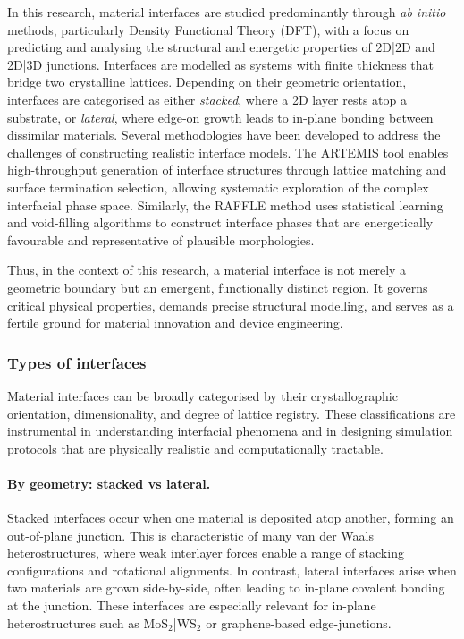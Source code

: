 In this research, material interfaces are studied predominantly through \textit{ab initio} methods, particularly Density Functional Theory (DFT), with a focus on predicting and analysing the structural and energetic properties of 2D|2D and 2D|3D junctions. Interfaces are modelled as systems with finite thickness that bridge two crystalline lattices. Depending on their geometric orientation, interfaces are categorised as either \emph{stacked}, where a 2D layer rests atop a substrate, or \emph{lateral}, where edge-on growth leads to in-plane bonding between dissimilar materials.
Several methodologies have been developed to address the challenges of constructing realistic interface models. The ARTEMIS tool enables high-throughput generation of interface structures through lattice matching and surface termination selection, allowing systematic exploration of the complex interfacial phase space. Similarly, the RAFFLE method uses statistical learning and void-filling algorithms to construct interface phases that are energetically favourable and representative of plausible morphologies.

Thus, in the context of this research, a material interface is not merely a geometric boundary but an emergent, functionally distinct region. It governs critical physical properties, demands precise structural modelling, and serves as a fertile ground for material innovation and device engineering.

\subsubsection{Types of interfaces}

Material interfaces can be broadly categorised by their crystallographic orientation, dimensionality, and degree of lattice registry. These classifications are instrumental in understanding interfacial phenomena and in designing simulation protocols that are physically realistic and computationally tractable.

\paragraph{By geometry: stacked vs lateral.} Stacked interfaces occur when one material is deposited atop another, forming an out-of-plane junction. This is characteristic of many van der Waals heterostructures, where weak interlayer forces enable a range of stacking configurations and rotational alignments. In contrast, lateral interfaces arise when two materials are grown side-by-side, often leading to in-plane covalent bonding at the junction. These interfaces are especially relevant for in-plane heterostructures such as MoS$_2$|WS$_2$ or graphene-based edge-junctions.


